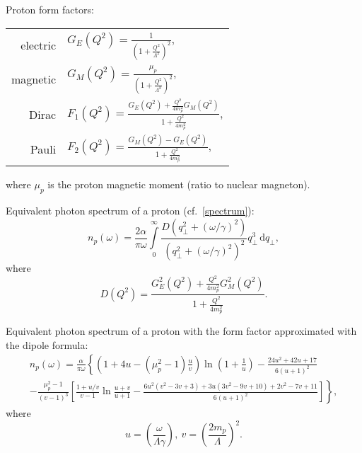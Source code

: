 \documentclass[a4paper,12pt]{article}
\begin{document}
Proton form factors: \\
\begin{center}
  \begin{tabular}{rl}
    electric
    & $G_E(Q^2) = \frac{1}{\left(1 + \frac{Q^2}{\Lambda^2} \right)^2}$, \\
    magnetic
    & $G_M(Q^2) = \frac{\mu_p}{\left(1 + \frac{Q^2}{\Lambda^2} \right)^2}$, \\
    Dirac
    &
    $F_1(Q^2)
     = \frac{G_E(Q^2) + \frac{Q^2}{4 m_p^2} G_M(Q^2)}
            {1 + \frac{Q^2}{4 m_p^2}}$, \\
    Pauli
    & $F_2(Q^2) = \frac{G_M(Q^2) - G_E(Q^2)}{1 + \frac{Q^2}{4 m_p^2}}$, \\
  \end{tabular}
\end{center}
where $\mu_p$ is the proton magnetic moment (ratio to nuclear magneton).

Equivalent photon spectrum of a proton (cf.~\eqref{spectrum}):
\begin{equation}
  n_p(\omega)
  = \frac{2 \alpha}{\pi \omega}
    \int\limits_0^\infty
      \frac{D(q_\perp^2 + (\omega / \gamma)^2)}
           {(q_\perp^2 + (\omega / \gamma)^2)^2}
      q_\perp^3
    \, \mathrm{d} q_\perp,
\end{equation}
where
\begin{equation}
  D(Q^2)
  = \frac{G_E^2(Q^2) + \frac{Q^2}{4 m_p^2} G_M^2(Q^2)}{1 + \frac{Q^2}{4 m_p^2}}.
\end{equation}

Equivalent photon spectrum of a proton with the form factor approximated with
the dipole formula:
\begin{multline}
  n_p(\omega)
  = \frac{\alpha}{\pi \omega}
    \left\{
      \left( 1 + 4 u - (\mu_p^2 - 1) \frac{u}{v} \right)
      \ln \left( 1 + \frac{1}{u} \right)
      - \frac{24 u^2 + 42 u + 17}{6 (u + 1)^2}
    \right. \\ \left.
      - \frac{\mu_p^2 - 1}{(v - 1)^3}
        \left[
            \frac{1 + u / v}{v - 1} \ln \frac{u + v}{u + 1}
          - \frac{6 u^2 (v^2 - 3v + 3) + 3u (3v^2 - 9v + 10) + 2v^2 - 7v + 11}
                 {6 (u + 1)^2}
        \right]
    \right\},
\end{multline}
where
\begin{equation}
  u = \left( \frac{\omega}{\Lambda \gamma} \right), \ 
  v = \left( \frac{2 m_p}{\Lambda} \right)^2.
\end{equation}
\end{document}
